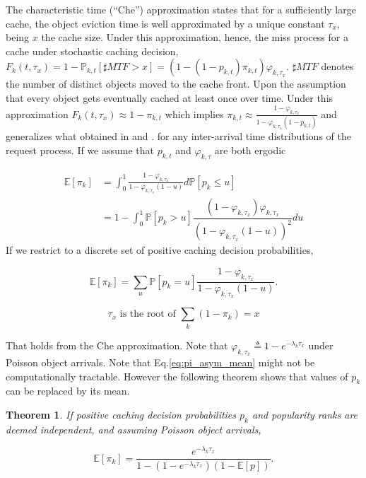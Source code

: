 \documentclass[conference]{IEEEtran}
\newtheorem{theorem}{Theorem}
\begin{document}
The characteristic time (``Che'') approximation 
\cite{Che:2006:HWC:2312147.2313846} states that for a 
sufficiently large cache, the object eviction time is well 
approximated by a unique constant $\tau_x$, being $x$ the 
cache size.  Under this approximation, hence, the miss 
process for a cache under stochastic caching decision, 
$F_k(t, \tau_x) = 1 - \mathbb{P}_{k,t}[ \sharp MTF > x] = (1 
- (1 - p_{k,t})\pi_{k,t}) \varphi_{k,\tau_x}$.
$\sharp MTF$ denotes the number of distinct objects moved to 
the cache front. Upon the assumption that every object gets 
eventually cached at least once over time.
Under this approximation $F_k(t, \tau_x) \approx 1-\pi_{k,t}$ 
which implies $\pi_{k,t} {\approx} \frac{1 - 
\varphi_{k,\tau_x}}{1 - \varphi_{k,\tau_x}(1 - p_{k,t})}$
and generalizes what obtained in 
\cite{DBLP:journals/corr/MartinaGL13} and 
\cite{Bianchi:2013:CBS:2500098.2500106}.
for any inter-arrival time distributions of the request 
process. If we assume that $p_{k,t}$ and $\varphi_{k,\tau}$  
are both ergodic 

\begin{align}
\mathbb{E}[\pi_k] &=  \int_{0}^{1}{\frac{1 - 
\varphi_{k,\tau_x}}{1 - \varphi_{k,\tau_x}(1 - u)} 
d\mathbb{P}[p_k \leq u]} \nonumber \\
&= 1 - \int_0^1 \mathbb{P}[p_k > u] \dfrac{(1 - 
\varphi_{k,\tau_x}) \varphi_{k,\tau_x}}{(1 - 
\varphi_{k,\tau_x}(1 - u))^2}du
\end{align}
If we restrict to a discrete set of positive caching decision 
probabilities,

\begin{equation}
\label{eq:pi_asym_mean}
\mathbb{E}[\pi_k] = \sum \limits_u \mathbb{P}[p_k = u] 
\frac{1 - \varphi_{k,\tau_x}}{1 - \varphi_{k,\tau_x}(1 - u)}.
\end{equation}

\begin{equation}
\label{eq:che}
\tau_x \text{ is the root of }  
\sum \limits_k (1 - \pi_{k}) = x
\end{equation}

That holds from the Che approximation. Note that 
$\varphi_{k,\tau_x} \triangleq 1 - e^{-\lambda_k \tau_x}$ 
under Poisson object arrivals. Note that 
Eq.\eqref{eq:pi_asym_mean} might not be computationally 
tractable. However the following theorem shows that values of 
$p_k$ can be replaced by its mean.

\begin{theorem}
\label{theo:pi_asym_LRU}
If positive caching decision probabilities $p_k$ and 
popularity ranks are deemed independent, and assuming Poisson 
object arrivals,

\begin{equation}
\mathbb{E}[\pi_k] = \frac{e^{-\lambda_k \tau_x}}{ 1 - (1 - 
e^{-\lambda_k \tau_x})(1 - \mathbb{E}[p])}.
\end{equation}
\label{jensen_asym}
\end{theorem}
\end{document}
